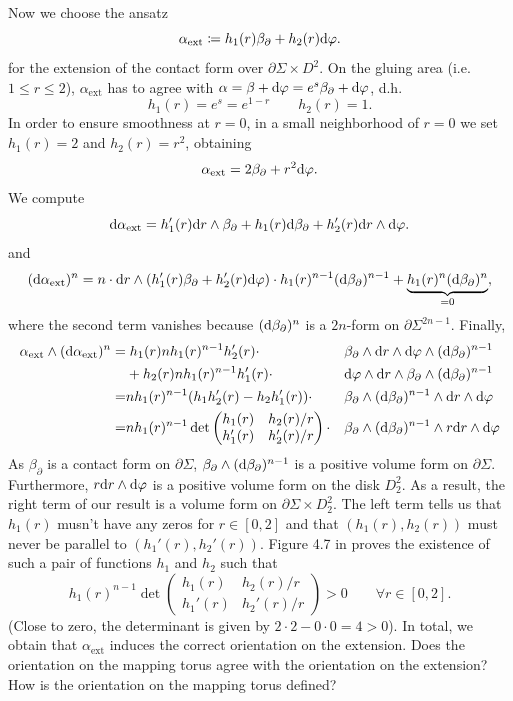 Now we choose the ansatz
\[
    \alpha_\text{ext} \coloneqq h_1(r) \beta_\partial + h_2(r) \mathrm{d}\varphi.
\]
for the extension of the contact form over $\partial \Sigma \times D^2$.
On the gluing area (i.e. $1 \le r \le 2$), $\alpha_\text{ext}$ has to agree with $\alpha = \beta + \mathrm{d} \varphi = e^s \beta_\partial + \mathrm{d} \varphi$,
d.h.
\[
    h_1(r) = e^s = e^{1-r} \qquad h_2(r) = 1.
\]
In order to ensure smoothness at $r=0$, in a small neighborhood of $r = 0$ we set $h_1(r) = 2$ and $h_2(r) = r^2$, obtaining
\[
    \alpha_\text{ext} = 2\beta_\partial + r^2\mathrm{d} \varphi.
\] 
We compute
\[
    \mathrm{d} \alpha_\text{ext} = h_1'(r)\mathrm{d} r\wedge \beta_\partial + h_1(r) \mathrm{d} \beta_\partial + h_2'(r) \mathrm{d} r \wedge \mathrm{d}\varphi.
\]
and
\[
    (\mathrm{d} \alpha_\text{ext})^n = n\cdot \mathrm{d} r\wedge (h_1'(r) \beta_\partial + h_2'(r) \mathrm{d}\varphi) \cdot h_1(r)^{n-1}(\mathrm{d} \beta_\partial)^{n-1} + \underbrace{h_1(r)^n (\mathrm{d} \beta_\partial)^n}_{=0},
\]
where the second term vanishes because $(\mathrm{d} \beta_\partial)^n$ is a $2n$-form on $\partial \Sigma^{2n-1}$.
Finally,
\begin{align*}
    \alpha_\text{ext} \wedge (\mathrm{d} \alpha_\text{ext})^n =& \;h_1(r)n h_1(r)^{n-1} h_2'(r) \cdot&&\beta_\partial \wedge \mathrm{d} r \wedge \mathrm{d} \varphi \wedge (\mathrm{d}\beta_\partial)^{n-1}\\
    &+ h_2(r)n h_1(r)^{n-1}h_1'(r) \cdot&&\mathrm{d} \varphi \wedge \mathrm{d} r \wedge \beta_\partial \wedge (\mathrm{d}\beta_\partial)^{n-1}\\
    =& n h_1(r)^{n-1}(h_1h_2'(r) - h_2h_1'(r)) \cdot &&\beta_\partial \wedge (\mathrm{d}\beta_\partial)^{n-1} \wedge \mathrm{d} r \wedge \mathrm{d} \varphi\\
    =& n h_1(r)^{n-1}\det \begin{pmatrix}
        h_1(r) & h_2(r)/r\\
        h_1'(r) & h_2'(r)/r
    \end{pmatrix} \cdot &&\beta_\partial \wedge (\mathrm{d}\beta_\partial)^{n-1} \wedge r \mathrm{d} r \wedge \mathrm{d} \varphi\\
\end{align*}
As $\beta_\partial$ is a contact form on $\partial \Sigma$, $\beta_\partial \wedge (\mathrm{d}\beta_\partial)^{n-1}$ is a positive volume form on $\partial \Sigma$. Furthermore, $r \mathrm{d} r\wedge \mathrm{d} \varphi$ is a positive volume form on the disk $D_2^2$. As a result, the right term of our result is a volume form on $\partial \Sigma \times D_2^2$.
The left term tells us that $h_1(r)$ musn't have any zeros for $r \in [0,2]$ and that $(h_1(r), h_2(r))$ must never be parallel to $(h_1'(r), h_2'(r))$.
Figure 4.7 in \cite{Geiges08} proves the existence of such a pair of functions $h_1$ and $h_2$ such that 
\[
    h_1(r)^{n-1}\det \begin{pmatrix}
        h_1(r) & h_2(r)/r\\
        h_1'(r) & h_2'(r)/r
    \end{pmatrix} > 0 \qquad \forall r \in [0,2].
\]
(Close to zero, the determinant is given by $2 \cdot 2 - 0 \cdot 0 = 4 > 0$).
In total, we obtain that $\alpha_\text{ext}$ induces the correct orientation on the extension.
Does the orientation on the mapping torus agree with the orientation on the extension?
How is the orientation on the mapping torus defined?